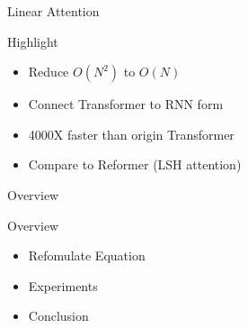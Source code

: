 \documentclass[10pt]{beamer}
\begin{document}
\begin{frame}[t]{Linear Attention}

    \begin{figure}
        \begin{center}
        \end{center}
    \end{figure}
    \begin{center}
    \end{center}
\end{frame}

\begin{frame}{Highlight}

    \begin{itemize}
        \item Reduce $O(N^2)$ to $O(N)$ 
        \item Connect Transformer to RNN form
        \item 4000X faster than origin Transformer
        \item Compare to Reformer (LSH attention)
    \end{itemize}

\end{frame}

\begin{frame}{Overview}

Overview
\begin{itemize}
    \item Refomulate Equation
    \item Experiments
    \item Conclusion
\end{itemize}

\end{frame}
\end{document}
